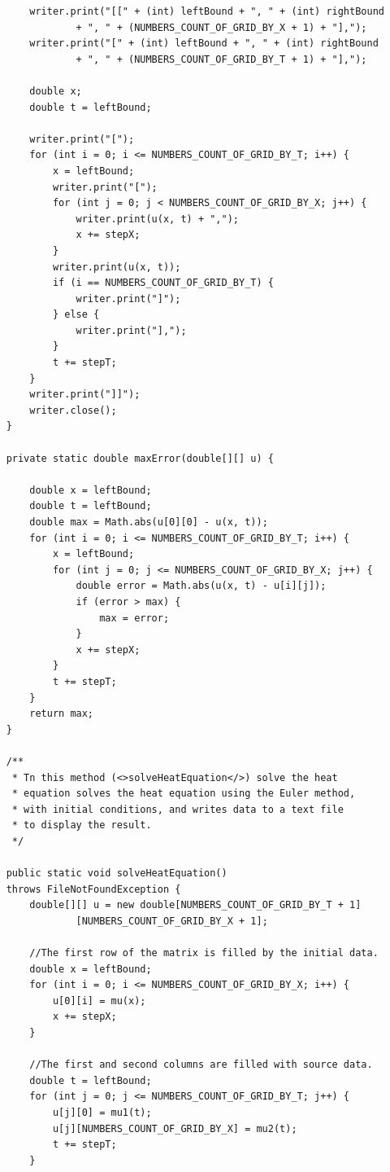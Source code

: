 \documentclass[12pt,a4paper]{scrartcl}
\begin{document}
\begin{verbatim}
        writer.print("[[" + (int) leftBound + ", " + (int) rightBound
                + ", " + (NUMBERS_COUNT_OF_GRID_BY_X + 1) + "],");
        writer.print("[" + (int) leftBound + ", " + (int) rightBound
                + ", " + (NUMBERS_COUNT_OF_GRID_BY_T + 1) + "],");

        double x;
        double t = leftBound;

        writer.print("[");
        for (int i = 0; i <= NUMBERS_COUNT_OF_GRID_BY_T; i++) {
            x = leftBound;
            writer.print("[");
            for (int j = 0; j < NUMBERS_COUNT_OF_GRID_BY_X; j++) {
                writer.print(u(x, t) + ",");
                x += stepX;
            }
            writer.print(u(x, t));
            if (i == NUMBERS_COUNT_OF_GRID_BY_T) {
                writer.print("]");
            } else {
                writer.print("],");
            }
            t += stepT;
        }
        writer.print("]]");
        writer.close();
    }

    private static double maxError(double[][] u) {

        double x = leftBound;
        double t = leftBound;
        double max = Math.abs(u[0][0] - u(x, t));
        for (int i = 0; i <= NUMBERS_COUNT_OF_GRID_BY_T; i++) {
            x = leftBound;
            for (int j = 0; j <= NUMBERS_COUNT_OF_GRID_BY_X; j++) {
                double error = Math.abs(u(x, t) - u[i][j]);
                if (error > max) {
                    max = error;
                }
                x += stepX;
            }
            t += stepT;
        }
        return max;
    }

    /**
     * Tn this method (<>solveHeatEquation</>) solve the heat
     * equation solves the heat equation using the Euler method,
     * with initial conditions, and writes data to a text file 
     * to display the result.
     */

    public static void solveHeatEquation() 
    throws FileNotFoundException {
        double[][] u = new double[NUMBERS_COUNT_OF_GRID_BY_T + 1]
                [NUMBERS_COUNT_OF_GRID_BY_X + 1];

        //The first row of the matrix is filled by the initial data.
        double x = leftBound;
        for (int i = 0; i <= NUMBERS_COUNT_OF_GRID_BY_X; i++) {
            u[0][i] = mu(x);
            x += stepX;
        }

        //The first and second columns are filled with source data.
        double t = leftBound;
        for (int j = 0; j <= NUMBERS_COUNT_OF_GRID_BY_T; j++) {
            u[j][0] = mu1(t);
            u[j][NUMBERS_COUNT_OF_GRID_BY_X] = mu2(t);
            t += stepT;
        }


\end{verbatim}
\end{document}
